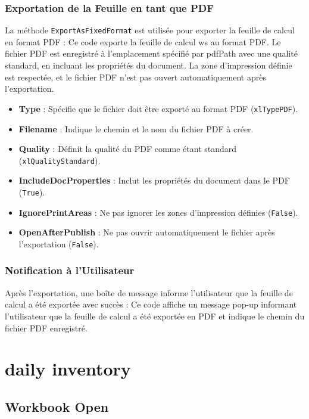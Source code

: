 \documentclass[a4paper, oneside, 12pt, final]{extreport}
\begin{document}
\subsubsection{Exportation de la Feuille en tant que PDF}

La méthode \texttt{ExportAsFixedFormat} est utilisée pour exporter la feuille de calcul en format PDF :
Ce code exporte la feuille de calcul ws au format PDF. Le fichier PDF est enregistré à l'emplacement spécifié par pdfPath avec une qualité standard, en incluant les propriétés du document. La zone d'impression définie est respectée, et le fichier PDF n'est pas ouvert automatiquement après l'exportation.
\begin{itemize}
    \item \textbf{Type} : Spécifie que le fichier doit être exporté au format PDF (\texttt{xlTypePDF}).
    \item \textbf{Filename} : Indique le chemin et le nom du fichier PDF à créer.
    \item \textbf{Quality} : Définit la qualité du PDF comme étant standard (\texttt{xlQualityStandard}).
    \item \textbf{IncludeDocProperties} : Inclut les propriétés du document dans le PDF (\texttt{True}).
    \item \textbf{IgnorePrintAreas} : Ne pas ignorer les zones d'impression définies (\texttt{False}).
    \item \textbf{OpenAfterPublish} : Ne pas ouvrir automatiquement le fichier après l'exportation (\texttt{False}).
\end{itemize}

\subsubsection{Notification à l'Utilisateur}

Après l'exportation, une boîte de message informe l'utilisateur que la feuille de calcul a été exportée avec succès :
Ce code affiche un message pop-up informant l'utilisateur que la feuille de calcul a été exportée en PDF et indique le chemin du fichier PDF enregistré.

\section{daily inventory}
\subsection{Workbook Open}
\end{document}
